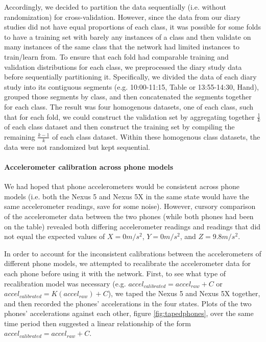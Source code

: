 Accordingly, we decided to partition the data sequentially (i.e. without randomization)
for cross-validation. However, since the data from our diary studies
did not have equal proportions of each class, it was possible for some folds
to have a training set with barely any instances of a class and then validate
on many instances of the same class that the network had limited instances
to train/learn from. To ensure that each fold had comparable training and validation distributions 
for each class, we preprocessed the diary study data before sequentially partitioning it. 
Specifically, we divided the data of each diary study into its 
contiguous segments (e.g. 10:00-11:15, Table or 13:55-14:30, Hand), grouped 
those segments by class, and then concatenated the segments together for each class. The result was four 
homogenous datasets, one of each class, such that for each fold, we could construct
the validation set by aggregating together $\frac{1}{k}$ of each class dataset and then
construct the training set by compiling the remaining $\frac{k - 1}{k}$ of each class dataset.
Within these homogenous class datasets, the data were not randomized but 
kept sequential.

\paragraph{Accelerometer calibration across phone models}
We had hoped that phone accelerometers would be consistent across phone models (i.e.
both the Nexus 5 and Nexus 5X in the same state would have the same accelerometer
readings, save for some noise). However, cursory comparison of the accelerometer data between the two phones 
(while both phones had been on the table) revealed both differing accelerometer readings and readings
that did not equal the expected values of $X = 0m/s^2$, $Y = 0m/s^2$, and $Z = 9.8m/s^2$. 




In order to account for the inconsistent calibrations between the accelerometers of different phone models, we
attempted to recalibrate the accelerometer data for each phone before using it with the network. 
First, to see what type of recalibration model was necessary (e.g. $accel_{calibrated} = accel_{raw} + C$ or
$accel_{calibrated} = K(accel_{raw}) + C$), we taped the Nexus 5 and Nexus 5X together, and then recorded
the phones' accelerations in the four states. Plots of the two phones' accelerations against each other, figure \ref{fig:tapedphones}, over the same time period
then suggested a linear relationship of the form $accel_{calibrated} = accel_{raw} + C$. 

